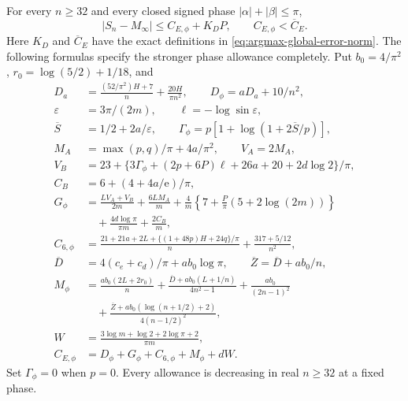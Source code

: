 \begin{lemma}\label{lem:phase-row-global}
For every $n\geq32$ and every closed signed phase $|\alpha|+|\beta|\leq\pi$,
\begin{equation}\label{eq:phase-global-bound}
 |S_n-M_\infty|\leq C_{E,\phi}+K_DP,
 \qquad C_{E,\phi}<\overline C_E.
\end{equation}
Here $K_D$ and $\overline C_E$ have the exact definitions in
\eqref{eq:argmax-global-error-norm}. The following formulas specify the
stronger phase allowance completely. Put $b_0=4/\pi^2$,
$r_0=\log(5/2)+1/18$, and
\begin{align*}
 D_a&=\frac{(52/\pi^2)H+7}{n}+\frac{20H}{\pi n^2},\qquad
 D_\phi=aD_a+10/n^2,\\
 \varepsilon&=3\pi/(2m),\qquad \ell=-\log\sin\varepsilon,\\
 \overline S&=1/2+2a/\varepsilon,\qquad
 \Gamma_\phi=p[1+\log(1+2\overline S/p)],\\
 M_A&=\max(p,q)/\pi+4a/\pi^2,\qquad V_A=2M_A,\\
 V_B&=23+\{3\Gamma_\phi+(2p+6P)\ell+26a+20+2d\log2\}/\pi,\\
 C_B&=6+(4+4a/\mathrm e)/\pi,\\
 G_\phi&=\frac{LV_A+V_B}{2m}+\frac{6LM_A}{m}
 +\frac4m\left\{7+\frac P\pi(5+2\log(2m))\right\}\\
 &\quad+\frac{4d\log\pi}{\pi m}+\frac{2C_B}{m},\\
 C_{6,\phi}&=\frac{21+21a+2L+\{(1+48p)H+24q\}/\pi}{n}
                    +\frac{317+5/12}{n^2},\\
 \overline D&=4(c_e+c_d)/\pi+ab_0\log\pi,\qquad
 \overline Z=\overline D+ab_0/n,\\
 M_\phi&=\frac{ab_0(2L+2r_0)}n
 +\frac{\overline D+ab_0(L+1/n)}{4n^2-1}
 +\frac{ab_0}{(2n-1)^2}\\
 &\quad+\frac{\overline Z+ab_0(\log(n+1/2)+2)}{4(n-1/2)^2},\\
 W&=\frac{3\log m+\log2+2\log\pi+2}{\pi m},\\
 C_{E,\phi}&=D_\phi+G_\phi+C_{6,\phi}+M_\phi+dW.
\end{align*}
Set $\Gamma_\phi=0$ when $p=0$. Every allowance is decreasing in real
$n\geq32$ at a fixed phase.
\end{lemma}

